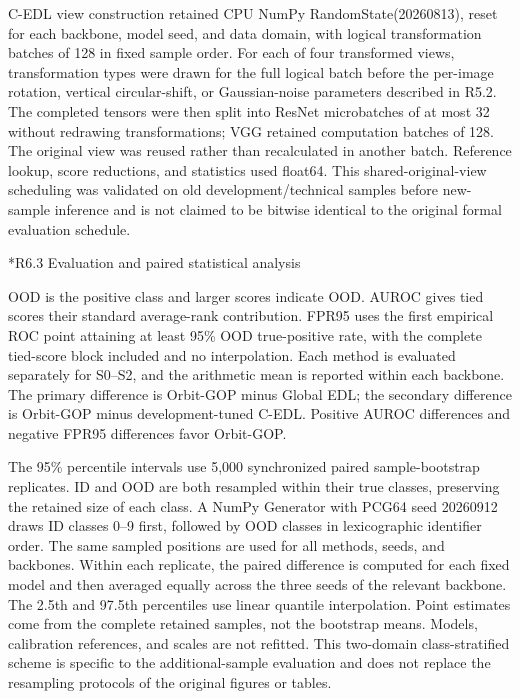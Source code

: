 \documentclass[11pt,a4paper]{article}
\makeatletter
\renewcommand\subsection{\@startsection{subsection}{2}{\z@}{-1.8ex plus -.5ex minus -.2ex}{.7ex plus .2ex}{\normalfont\normalsize\bfseries\raggedright}}
\makeatother
\begin{document}
C-EDL view construction retained CPU NumPy RandomState(20260813), reset for each backbone, model seed, and data domain, with logical transformation batches of 128 in fixed sample order. For each of four transformed views, transformation types were drawn for the full logical batch before the per-image rotation, vertical circular-shift, or Gaussian-noise parameters described in R5.2. The completed tensors were then split into ResNet microbatches of at most 32 without redrawing transformations; VGG retained computation batches of 128. The original view was reused rather than recalculated in another batch. Reference lookup, score reductions, and statistics used float64. This shared-original-view scheduling was validated on old development/technical samples before new-sample inference and is not claimed to be bitwise identical to the original formal evaluation schedule.

\subsection*{R6.3 Evaluation and paired statistical analysis}\label{s6.3-evaluation-and-paired-statistical-analysis}

OOD is the positive class and larger scores indicate OOD. AUROC gives tied scores their standard average-rank contribution. FPR95 uses the first empirical ROC point attaining at least 95\% OOD true-positive rate, with the complete tied-score block included and no interpolation. Each method is evaluated separately for S0--S2, and the arithmetic mean is reported within each backbone. The primary difference is Orbit-GOP minus Global EDL; the secondary difference is Orbit-GOP minus development-tuned C-EDL. Positive AUROC differences and negative FPR95 differences favor Orbit-GOP.

The 95\% percentile intervals use 5,000 synchronized paired sample-bootstrap replicates. ID and OOD are both resampled within their true classes, preserving the retained size of each class. A NumPy Generator with PCG64 seed 20260912 draws ID classes 0--9 first, followed by OOD classes in lexicographic identifier order. The same sampled positions are used for all methods, seeds, and backbones. Within each replicate, the paired difference is computed for each fixed model and then averaged equally across the three seeds of the relevant backbone. The 2.5th and 97.5th percentiles use linear quantile interpolation. Point estimates come from the complete retained samples, not the bootstrap means. Models, calibration references, and scales are not refitted. This two-domain class-stratified scheme is specific to the additional-sample evaluation and does not replace the resampling protocols of the original figures or tables.
\end{document}
